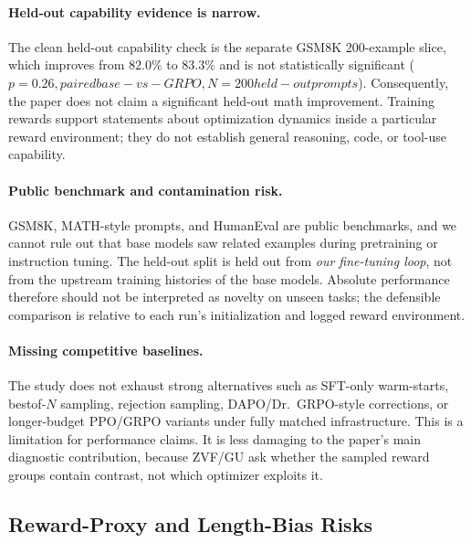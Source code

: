 \paragraph{Held-out capability evidence is narrow.}
The clean held-out capability check is the separate GSM8K 200-example slice,
which improves from $82.0\%$ to $83.3\%$ and is not statistically significant
($p=0.26, paired base-vs-GRPO, N=200 held-out prompts $).  Consequently, the paper does not claim a significant held-out math
improvement.  Training rewards support statements about optimization dynamics
inside a particular reward environment; they do not establish general reasoning,
code, or tool-use capability.

\paragraph{Public benchmark and contamination risk.}
GSM8K, MATH-style prompts, and HumanEval are public benchmarks, and we cannot
rule out that base models saw related examples during pretraining or instruction
tuning.  The held-out split is held out from \emph{our fine-tuning loop}, not
from the upstream training histories of the base models.  Absolute performance
therefore should not be interpreted as novelty on unseen tasks; the defensible
comparison is relative to each run's initialization and logged reward
environment.

\paragraph{Missing competitive baselines.}
The study does not exhaust strong alternatives such as SFT-only warm-starts,
bestof-$N$ sampling, rejection sampling, DAPO/Dr.~GRPO-style corrections, or
longer-budget PPO/GRPO variants under fully matched infrastructure.  This is a
limitation for performance claims.  It is less damaging to the paper's main
diagnostic contribution, because ZVF/GU ask whether the sampled reward groups
contain contrast, not which optimizer exploits it.

\subsection{Reward-Proxy and Length-Bias Risks}
\label{sec:length_bias}

